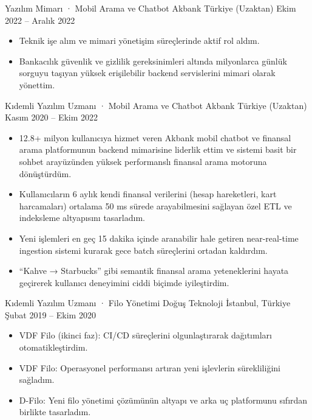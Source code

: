 \resumeSubheading
  {Yazılım Mimarı · Mobil Arama ve Chatbot}
  {Akbank}
  {Türkiye (Uzaktan)}
  {Ekim 2022 -- Aralık 2022}
\begin{itemize}
  \item Teknik işe alım ve mimari yönetişim süreçlerinde aktif rol aldım.
  \item Bankacılık güvenlik ve gizlilik gereksinimleri altında milyonlarca günlük sorguyu taşıyan yüksek erişilebilir backend servislerini mimari olarak yönettim.
\end{itemize}
\vspace{0.3em}

\resumeSubheading
  {Kıdemli Yazılım Uzmanı · Mobil Arama ve Chatbot}
  {Akbank}
  {Türkiye (Uzaktan)}
  {Kasım 2020 -- Ekim 2022}
\begin{itemize}
  \item 12.8+ milyon kullanıcıya hizmet veren Akbank mobil chatbot ve finansal arama platformunun backend mimarisine liderlik ettim ve sistemi basit bir sohbet arayüzünden yüksek performanslı finansal arama motoruna dönüştürdüm.
  \item Kullanıcıların 6 aylık kendi finansal verilerini (hesap hareketleri, kart harcamaları) ortalama 50 ms sürede arayabilmesini sağlayan özel ETL ve indeksleme altyapısını tasarladım.
  \item Yeni işlemleri en geç 15 dakika içinde aranabilir hale getiren near-real-time ingestion sistemi kurarak gece batch süreçlerini ortadan kaldırdım.
  \item “Kahve → Starbucks” gibi semantik finansal arama yeteneklerini hayata geçirerek kullanıcı deneyimini ciddi biçimde iyileştirdim.
\end{itemize}
\vspace{0.3em}

\resumeSubheading
  {Kıdemli Yazılım Uzmanı · Filo Yönetimi}
  {Doğuş Teknoloji}
  {İstanbul, Türkiye}
  {Şubat 2019 -- Ekim 2020}
\begin{itemize}
  \item VDF Filo (ikinci faz): CI/CD süreçlerini olgunlaştırarak dağıtımları otomatikleştirdim.
  \item VDF Filo: Operasyonel performansı artıran yeni işlevlerin sürekliliğini sağladım.
  \item D-Filo: Yeni filo yönetimi çözümünün altyapı ve arka uç platformunu sıfırdan birlikte tasarladım.
\end{itemize}
\vspace{0.3em}

